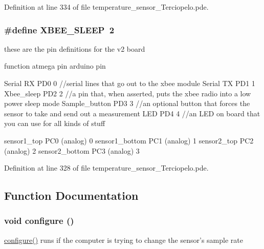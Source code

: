 Definition at line 334 of file temperature\_\-sensor\_\-Terciopelo.pde.\hypertarget{temperature__sensor___terciopelo_8pde_658c2878485cfe5cc625d283a6d34bc1}{
\subsubsection[{XBEE\_\-SLEEP}]{\setlength{\rightskip}{0pt plus 5cm}\#define XBEE\_\-SLEEP~2}}
\label{temperature__sensor___terciopelo_8pde_658c2878485cfe5cc625d283a6d34bc1}


these are the pin definitions for the v2 board

function atmega pin arduino pin

Serial RX PD0 0 //serial lines that go out to the xbee module Serial TX PD1 1 Xbee\_\-sleep PD2 2 //a pin that, when asserted, puts the xbee radio into a low power sleep mode Sample\_\-button PD3 3 //an optional button that forces the sensor to take and send out a measurement LED PD4 4 //an LED on board that you can use for all kinds of stuff

sensor1\_\-top PC0 (analog) 0 sensor1\_\-bottom PC1 (analog) 1 sensor2\_\-top PC2 (analog) 2 sensor2\_\-bottom PC3 (analog) 3 

Definition at line 328 of file temperature\_\-sensor\_\-Terciopelo.pde.

\subsection{Function Documentation}
\hypertarget{temperature__sensor___terciopelo_8pde_e369b3765489ee8bd0ea791c1843630f}{
\subsubsection[{configure}]{\setlength{\rightskip}{0pt plus 5cm}void configure ()}}
\label{temperature__sensor___terciopelo_8pde_e369b3765489ee8bd0ea791c1843630f}


\hyperlink{applet_2nublogger_8h_e369b3765489ee8bd0ea791c1843630f}{configure()} runs if the computer is trying to change the sensor's sample rate 

